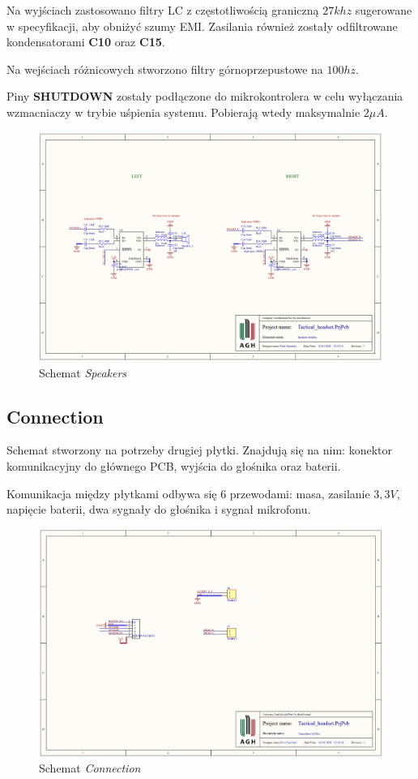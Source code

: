 Na wyjściach zastosowano filtry LC z częstotliwością graniczną $27khz$ sugerowane w specyfikacji, aby obniżyć szumy EMI. Zasilania również zostały odfiltrowane kondensatorami \textbf{C10} oraz \textbf{C15}.

Na wejściach różnicowych stworzono filtry górnoprzepustowe na $100hz$.

Piny \textbf{SHUTDOWN} zostały podłączone do mikrokontrolera w celu wyłączania wzmacniaczy w trybie uśpienia systemu. Pobierają wtedy maksymalnie $2\mu A$. 

\begin{figure}[H]
	\centering
	\includegraphics[scale=0.4]{zdjecia/PCB/speakers.png}
	\caption{\label{speakers} Schemat \textit{Speakers}}
\end{figure}


\subsection{Connection}

Schemat stworzony na potrzeby drugiej płytki. Znajdują się na nim: konektor komunikacyjny do głównego PCB, wyjścia do głośnika oraz baterii.

Komunikacja między płytkami odbywa się 6 przewodami: masa, zasilanie $3,3V$, napięcie baterii, dwa sygnały do głośnika i sygnał mikrofonu.

\begin{figure}[H]
	\centering
	\includegraphics[scale=0.4]{zdjecia/PCB/connection.png}
	\caption{\label{connection} Schemat \textit{Connection}}
\end{figure}


